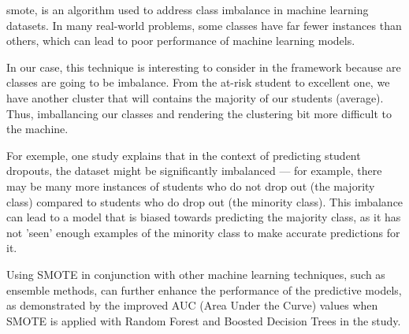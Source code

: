 \documentclass[../../../main.tex]{subfiles}
\begin{document}
\acrfull{smote}, is an algorithm used to address class imbalance in machine learning datasets. In many real-world problems, some classes have far fewer instances than others, which can lead to poor performance of machine learning models. 

In our case, this technique is interesting to consider in the framework because are classes are going to be imbalance. From the at-risk student to excellent one, we have another cluster that will contains the majority of our students (average). Thus, imballancing our classes and rendering the clustering bit more difficult to the machine.

For exemple, one study \cite{lee_machine_2019} explains that in the context of predicting student dropouts, the dataset might be significantly imbalanced — for example, there may be many more instances of students who do not drop out (the majority class) compared to students who do drop out (the minority class). This imbalance can lead to a model that is biased towards predicting the majority class, as it has not 'seen' enough examples of the minority class to make accurate predictions for it.

Using SMOTE in conjunction with other machine learning techniques, such as ensemble methods, can further enhance the performance of the predictive models, as demonstrated by the improved AUC (Area Under the Curve) values when SMOTE is applied with Random Forest and Boosted Decision Trees in the study.\cite{lee_machine_2019,beyan_classifying_2015, galar_review_2012,gong_rhsboost_2017,haixiang_bpso-adaboost-knn_2016,haixiang_learning_2017}
\end{document}
